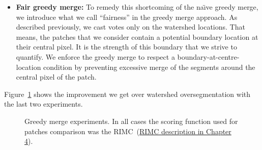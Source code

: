 \begin{enumerate}
 \begin{itemize}
  \item{\bf Fair greedy merge:} To remedy this shortcoming of the na\"{\i}ve greedy merge, we introduce what we call ``fairness'' in the greedy merge approach. As described previously, we cast votes only on the watershed locations. That means, the patches that we consider contain a potential boundary location at their central pixel. It is the strength of this boundary that we strive to quantify. We enforce the greedy merge to respect a boundary-at-centre-location condition by preventing excessive merge of the segments around the central pixel of the patch.
 \end{itemize}

Figure~\ref{fig:segs-to-greedy-merge-RIMC} shows the improvement we get over watershed oversegmentation with the last two experiments.

\begin{figure}[ht!]
\centering
\caption{Greedy merge experiments. In all cases the scoring function used for patches comparison was the RIMC~(\hyperref[RIMC-maths]{RIMC description in Chapter 4}).} %
\label{fig:segs-to-greedy-merge-RIMC}
\end{figure}


\end{enumerate}

